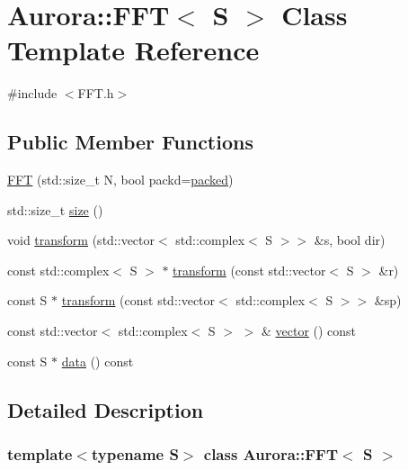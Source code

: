 \hypertarget{class_aurora_1_1_f_f_t}{}\section{Aurora\+:\+:F\+FT$<$ S $>$ Class Template Reference}
\label{class_aurora_1_1_f_f_t}


{\ttfamily \#include $<$F\+F\+T.\+h$>$}

\subsection*{Public Member Functions}
\begin{DoxyCompactItemize}
\item 
\hyperlink{class_aurora_1_1_f_f_t_a89e14a054e328bd8a0d477691f690135}{F\+FT} (std\+::size\+\_\+t N, bool packd=\hyperlink{namespace_aurora_a3e70ffc9ea5c526dcd66b1b14e43f175}{packed})
\item 
std\+::size\+\_\+t \hyperlink{class_aurora_1_1_f_f_t_ad0149c60672d3f4e64850dde22f5b163}{size} ()
\item 
void \hyperlink{class_aurora_1_1_f_f_t_a8325de64c8b9f208ed0bc8db3f74e4c7}{transform} (std\+::vector$<$ std\+::complex$<$ S $>$$>$ \&s, bool dir)
\item 
const std\+::complex$<$ S $>$ $\ast$ \hyperlink{class_aurora_1_1_f_f_t_a51ed1e25953c12b7f4cc145d19ee5cd8}{transform} (const std\+::vector$<$ S $>$ \&r)
\item 
const S $\ast$ \hyperlink{class_aurora_1_1_f_f_t_a9331bca89f3782409a7587611f1e4bab}{transform} (const std\+::vector$<$ std\+::complex$<$ S $>$$>$ \&sp)
\item 
const std\+::vector$<$ std\+::complex$<$ S $>$ $>$ \& \hyperlink{class_aurora_1_1_f_f_t_a67003935e240d8b4cf858430f6063913}{vector} () const
\item 
const S $\ast$ \hyperlink{class_aurora_1_1_f_f_t_a7462e77c06228475f0f491d7a25d7bba}{data} () const
\end{DoxyCompactItemize}


\subsection{Detailed Description}
\subsubsection*{template$<$typename S$>$\newline
class Aurora\+::\+F\+F\+T$<$ S $>$}

